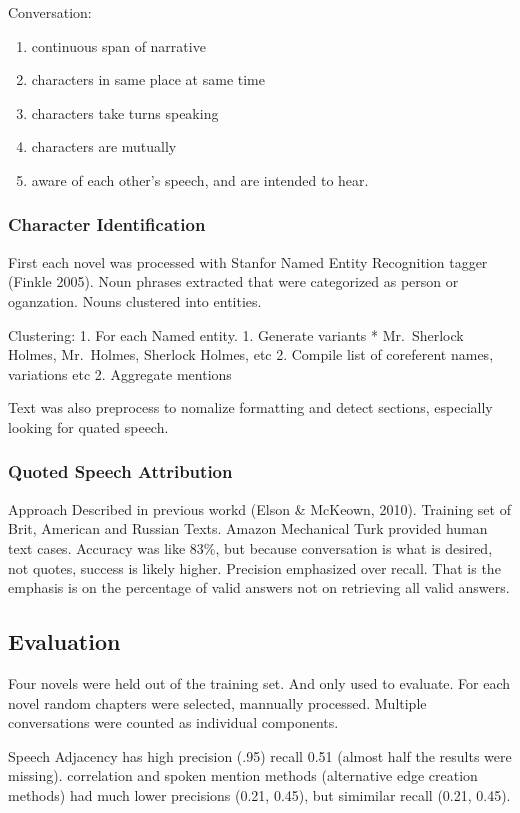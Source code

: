 \documentclass{report}\usepackage[]{graphicx}\usepackage[]{color}
\begin{document}
{Conversation: 
\begin{enumerate}
\item
  continuous span of narrative
\item
  characters in same place at same time
\item
  characters take turns speaking
\item
  characters are mutually
\item
  aware of each other's speech, and are intended to hear.
\end{enumerate}

\subsubsection{Character Identification}

First each novel was processed with Stanfor Named Entity Recognition
tagger (Finkle 2005). Noun phrases extracted that were categorized as
person or oganzation. Nouns clustered into entities.

Clustering: 1. For each Named entity. 1. Generate variants *
Mr.~Sherlock Holmes, Mr.~Holmes, Sherlock Holmes, etc 2. Compile list of
coreferent names, variations etc 2. Aggregate mentions

Text was also preprocess to nomalize formatting and detect sections,
especially looking for quated speech.

\subsubsection{Quoted Speech Attribution}

Approach Described in previous workd (Elson \& McKeown, 2010). Training
set of Brit, American and Russian Texts. Amazon Mechanical Turk provided
human text cases. Accuracy was like 83\%, but because conversation is
what is desired, not quotes, success is likely higher. Precision
emphasized over recall. That is the emphasis is on the percentage of
valid answers not on retrieving all valid answers.

\subsection{Evaluation}

Four novels were held out of the training set. And only used to
evaluate. For each novel random chapters were selected, mannually
processed. Multiple conversations were counted as individual components.

Speech Adjacency has high precision (.95) recall 0.51 (almost half the
results were missing). correlation and spoken mention methods
(alternative edge creation methods) had much lower precisions (0.21,
0.45), but simimilar recall (0.21, 0.45).

}
\end{document}

